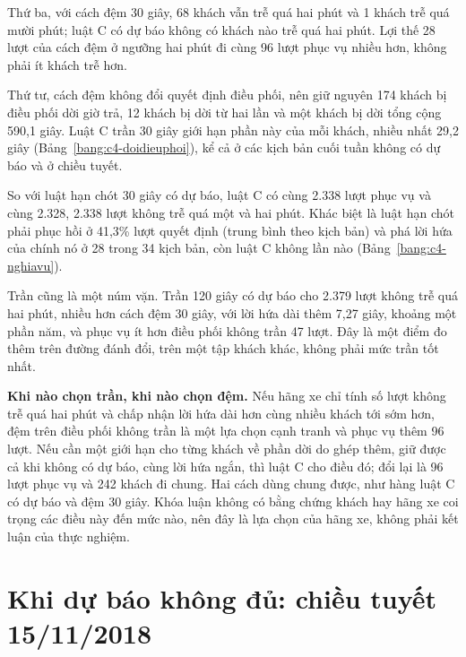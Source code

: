 Thứ ba, với cách đệm 30 giây, 68 khách vẫn trễ quá hai phút và 1 khách trễ quá mười phút; luật C có dự báo không có
khách nào trễ quá hai phút. Lợi thế 28 lượt của cách đệm ở ngưỡng hai phút đi cùng 96 lượt phục vụ nhiều hơn, không
phải ít khách trễ hơn.

Thứ tư, cách đệm không đổi quyết định điều phối, nên giữ nguyên 174 khách bị điều phối dời giờ trả, 12 khách bị dời
từ hai lần và một khách bị dời tổng cộng 590,1 giây. Luật C trần 30 giây giới hạn phần này của mỗi khách, nhiều nhất
29,2 giây (Bảng~\ref{bang:c4-doidieuphoi}), kể cả ở các kịch bản cuối tuần không có dự báo và ở chiều tuyết.

So với luật hạn chót 30 giây có dự báo, luật C có cùng 2.338 lượt phục vụ và cùng 2.328, 2.338 lượt không trễ quá
một và hai phút. Khác biệt là luật hạn chót phải phục hồi ở 41,3\% lượt quyết định (trung bình theo kịch bản) và phá
lời hứa của chính nó ở 28 trong 34 kịch bản, còn luật C không lần nào (Bảng~\ref{bang:c4-nghiavu}).

Trần cũng là một núm vặn. Trần 120 giây có dự báo cho 2.379 lượt không trễ quá hai phút, nhiều hơn cách đệm 30 giây,
với lời hứa dài thêm 7,27 giây, khoảng một phần năm, và phục vụ ít hơn điều phối không trần 47 lượt. Đây là một
điểm đo thêm trên đường đánh đổi, trên một tập khách khác, không phải mức trần tốt nhất.

\textbf{Khi nào chọn trần, khi nào chọn đệm.} Nếu hãng xe chỉ tính số lượt không trễ quá hai phút và chấp nhận lời
hứa dài hơn cùng nhiều khách tới sớm hơn, đệm trên điều phối không trần là một lựa chọn cạnh tranh và phục vụ thêm
96 lượt. Nếu cần một giới hạn cho từng khách về phần dời do ghép thêm, giữ được cả khi không có dự báo, cùng lời
hứa ngắn, thì luật C cho điều đó; đổi lại là 96 lượt phục vụ và 242 khách đi chung. Hai cách dùng chung được, như
hàng luật C có dự báo và đệm 30 giây. Khóa luận không có bằng chứng khách hay hãng xe coi trọng các điều này đến
mức nào, nên đây là lựa chọn của hãng xe, không phải kết luận của thực nghiệm.

\section{Khi dự báo không đủ: chiều tuyết 15/11/2018}
\label{muc:c4-tuyet}

